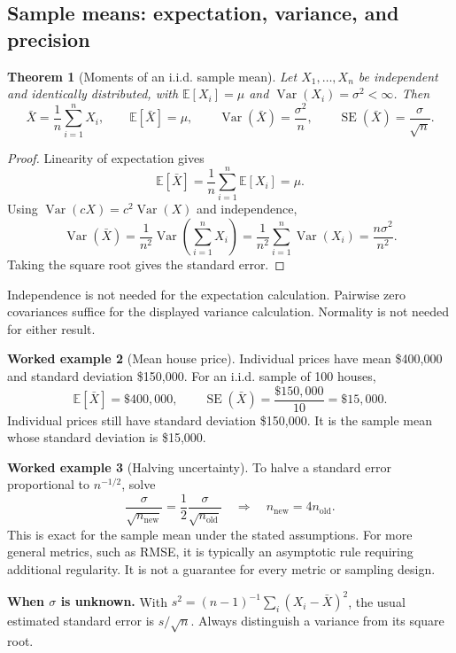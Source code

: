 \documentclass[11pt,letterpaper]{article}
\newcommand{\E}{\mathbb E}
\newcommand{\Var}{\operatorname{Var}}
\newcommand{\SE}{\operatorname{SE}}
\newtheorem{theorem}{Theorem}[section]
\theoremstyle{definition}
\newtheorem{example}[theorem]{Worked example}
\theoremstyle{remark}
\numberwithin{equation}{section}
\begin{document}
\subsection{Sample means: expectation, variance, and precision}
\begin{theorem}[Moments of an i.i.d. sample mean]
Let $X_1,\ldots,X_n$ be independent and identically distributed, with
$\E[X_i]=\mu$ and $\Var(X_i)=\sigma^2<\infty$. Then
\begin{equation}
\bar X=\frac1n\sum_{i=1}^nX_i,\qquad
\E[\bar X]=\mu,\qquad
\Var(\bar X)=\frac{\sigma^2}{n},\qquad
\SE(\bar X)=\frac{\sigma}{\sqrt n}.
\end{equation}
\end{theorem}
\begin{proof}
Linearity of expectation gives
\[
\E[\bar X]=\frac1n\sum_{i=1}^n\E[X_i]=\mu.
\]
Using $\Var(cX)=c^2\Var(X)$ and independence,
\[
\Var(\bar X)=\frac1{n^2}\Var\!\left(\sum_{i=1}^nX_i\right)
=\frac1{n^2}\sum_{i=1}^n\Var(X_i)=\frac{n\sigma^2}{n^2}.
\]
Taking the square root gives the standard error.
\end{proof}
Independence is not needed for the expectation calculation. Pairwise zero
covariances suffice for the displayed variance calculation. Normality is not
needed for either result.

\begin{example}[Mean house price]
Individual prices have mean \$400,000 and standard deviation \$150,000.
For an i.i.d. sample of 100 houses,
\[
\E[\bar X]=\$400{,}000,\qquad
\SE(\bar X)=\frac{\$150{,}000}{10}=\$15{,}000.
\]
Individual prices still have standard deviation \$150,000. It is the sample mean
whose standard deviation is \$15,000.
\end{example}
\begin{example}[Halving uncertainty]
To halve a standard error proportional to $n^{-1/2}$, solve
\[
\frac{\sigma}{\sqrt{n_{\mathrm{new}}}}
=\frac12\frac{\sigma}{\sqrt{n_{\mathrm{old}}}}
\quad\Longrightarrow\quad n_{\mathrm{new}}=4n_{\mathrm{old}}.
\]
This is exact for the sample mean under the stated assumptions. For more general
metrics, such as RMSE, it is typically an asymptotic rule requiring additional
regularity. It is not a guarantee for every metric or sampling design.
\end{example}
\textbf{When $\sigma$ is unknown.} With
$s^2=(n-1)^{-1}\sum_i(X_i-\bar X)^2$, the usual estimated standard error is
$s/\sqrt n$. Always distinguish a variance from its square root.
\newpage
\end{document}
